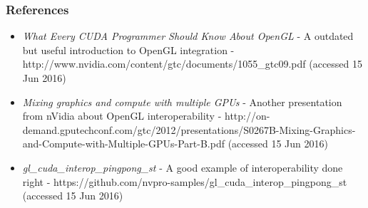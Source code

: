 \begin{frame}

\frametitle{References}

\begin{itemize}
	\item{\emph{What Every CUDA Programmer Should Know About OpenGL} -
		A outdated but useful introduction to OpenGL integration -
		http://www.nvidia.com/content/gtc/documents/1055_gtc09.pdf (accessed 15 Jun 2016)}
	\item{\emph{Mixing graphics and compute with multiple GPUs} -
		Another presentation from nVidia about OpenGL interoperability -
		http://on-demand.gputechconf.com/gtc/2012/presentations/S0267B-Mixing-Graphics-and-Compute-with-Multiple-GPUs-Part-B.pdf (accessed 15 Jun 2016)}
	\item{\emph{gl_cuda_interop_pingpong_st} -
		A good example of interoperability done right -
		https://github.com/nvpro-samples/gl_cuda_interop_pingpong_st (accessed 15 Jun 2016)}
\end{itemize}

\end{frame}
